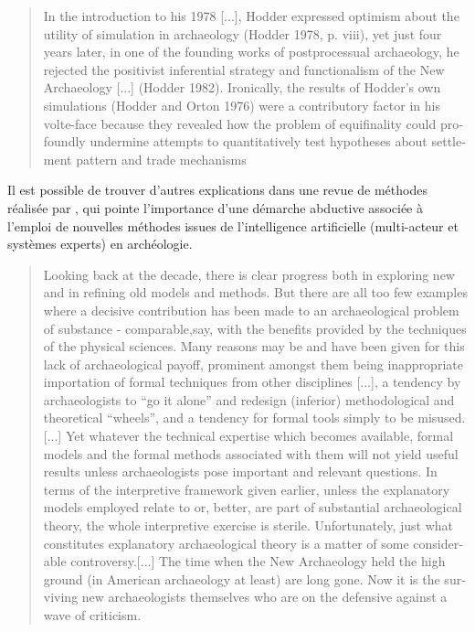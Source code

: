 \foreignblockquote{english}[{\cite[7]{Lake2013}}]{In the introduction to his 1978 [...], Hodder expressed optimism about the utility of simulation in archaeology (Hodder 1978, p. viii), yet just four years later, in one of the founding works of postprocessual archaeology, he rejected the positivist inferential strategy and functionalism of the New Archaeology [...] (Hodder 1982). Ironically, the results of Hodder's own simulations (Hodder and Orton 1976) were a contributory factor in his volte-face because they revealed how the problem of equifinality could profoundly undermine attempts to quantitatively test hypotheses about settlement pattern and trade mechanisms}

Il est possible de trouver d'autres explications dans une revue de méthodes réalisée par \textcite{Doran1986}, qui pointe l'importance d'une démarche abductive associée à l'emploi de nouvelles méthodes \autocite{Doran1982} issues de l'intelligence artificielle (multi-acteur et systèmes experts) en archéologie.

\foreignblockquote{english}[\cite{Doran1986}]{Looking back at the decade, there is clear progress both in exploring new and in refining old models and methods. But there are all too few examples where a decisive contribution has been made to an archaeological problem of substance - comparable,say, with the benefits provided by the techniques of the physical sciences. Many reasons may be and have been given for this lack of archaeological payoff, prominent amongst them being inappropriate importation of formal techniques from other disciplines [...], a tendency by archaeologists to \enquote{go it alone} and redesign (inferior) methodological and theoretical \enquote{wheels}, and a tendency for formal tools simply to be misused. [...] Yet whatever the technical expertise which becomes available, formal models and the formal methods associated with them will not yield useful results unless archaeologists pose important and relevant questions. In terms of the interpretive framework given earlier, unless the explanatory models employed relate to or, better, are part of substantial archaeological theory, the whole interpretive exercise is sterile. Unfortunately, just what constitutes explanatory archaeological theory is a matter of some considerable controversy.[...] The time when the New Archaeology held the high ground (in American archaeology at least) are long gone. Now it is the surviving new archaeologists themselves who are on the defensive against a wave of criticism.}

